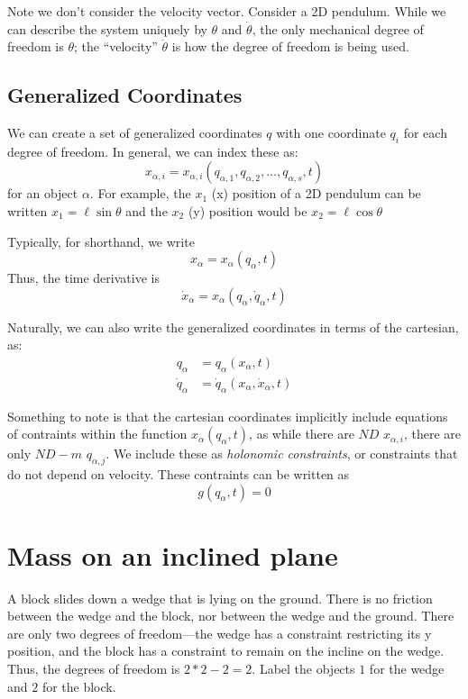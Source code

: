 Note we don't consider the velocity vector. Consider a 2D pendulum. While we can describe the system uniquely by \(\theta\) and \(\dot\theta\), the only mechanical degree of freedom is \(\theta\); the ``velocity'' \(\dot\theta\) is how the degree of freedom is being used.

\subsection{Generalized Coordinates}
We can create a set of generalized coordinates \(q\) with one coordinate \(q_i\) for each degree of freedom. In general, we can index these as:
\begin{equation}
	x_{\alpha,i}= x_{\alpha,i}(q_{\alpha,1}, q_{\alpha,2},\ldots,q_{\alpha,s},t)
\end{equation}
for an object \(\alpha\). For example, the \(x_1\) (x) position of a 2D pendulum can be written \(x_1=\ell\sin\theta\) and the \(x_2\) (y) position would be \(x_2=\ell\cos\theta\)

Typically, for shorthand, we write
\begin{equation}
	x_\alpha=x_\alpha(q_\alpha,t)
\end{equation}
Thus, the time derivative is
\begin{equation}
	\dot x_\alpha=x_\alpha(q_\alpha, \dot q_\alpha, t)
\end{equation}

Naturally, we can also write the generalized coordinates in terms of the cartesian, as:
\begin{subequations}
	\begin{align}
		q_\alpha &= q_\alpha(x_\alpha,t)\\
		\dot q_\alpha&=\dot q_\alpha (x_\alpha, \dot x_\alpha, t)
	\end{align}
\end{subequations}

Something to note is that the cartesian coordinates implicitly include equations of contraints within the function \(x_\alpha(q_\alpha,t)\), as while there are \(ND\) \(x_{\alpha,i}\), there are only \(ND-m\) \(q_{\alpha,j}\). We include these as \emph{holonomic constraints}, or constraints that do not depend on velocity. These contraints can be written as 
\begin{equation}
	g(q_\alpha, t)=0
\end{equation}


\section{Mass on an inclined plane}
A block slides down a wedge that is lying on the ground. There is no friction between the wedge and the block, nor between the wedge and the ground. There are only two degrees of freedom---the wedge has a constraint restricting its y position, and the block has a constraint to remain on the incline on the wedge. Thus, the degrees of freedom is \(2*2-2=2\).
Label the objects \(1\) for the wedge and \(2\) for the block.

